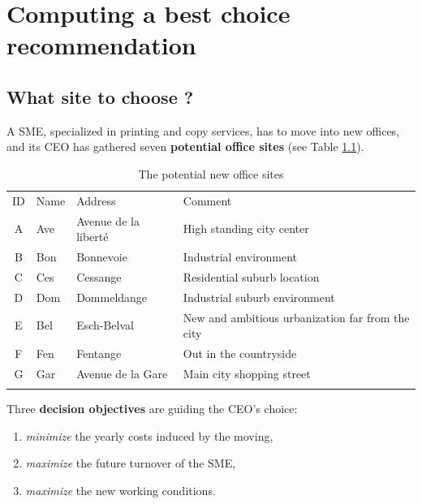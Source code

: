 \chapter{Computing a best choice recommendation}
\label{sec:6}



\section{What site to choose ?}
\label{sec:6.1}

A SME, specialized in printing and copy services, has to move into new offices, and its CEO has gathered seven \textbf{potential office sites} (see Table \ref{tab:6.1}).

\begin{table}[h]
\caption{The potential new office sites}
\label{tab:6.1}       %
\begin{center}
    \begin{tabular}{c|l|l|l}
      \hline\noalign{\smallskip}
      ID & Name & Address & Comment\\
      \noalign{\smallskip}\hline\noalign{\smallskip}
    A &   Ave  &  Avenue de la liberté &  High standing city center\\
    B &   Bon  &  Bonnevoie &             Industrial environment\\
    C &   Ces  &  Cessange &              Residential suburb location\\
    D &   Dom  &  Dommeldange &           Industrial suburb environment\\
    E &   Bel  &  Esch-Belval &           New and ambitious urbanization far from the city\\
    F &   Fen  &  Fentange &              Out in the countryside\\
      G &   Gar  &  Avenue de la Gare &     Main city shopping street\\
      \noalign{\smallskip}\hline
    \end{tabular}
\end{center}
\end{table}

Three \textbf{decision objectives} are guiding the CEO's choice:
\begin{enumerate}
\item \emph{minimize} the yearly costs induced by the moving,
\item \emph{maximize} the future turnover of the SME,
\item \emph{maximize} the new working conditions.
\end{enumerate}

